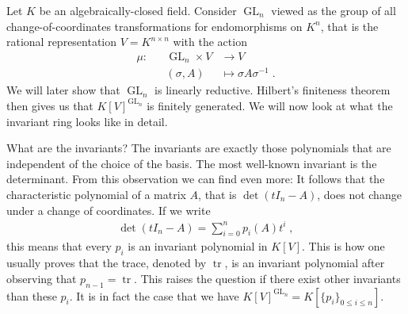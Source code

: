 \begin{dexample}
  Let $K$ be an algebraically-closed field.
  Consider $\operatorname{GL}_n$ viewed as the group of all change-of-coordinates transformations for endomorphisms on $K^n$, that is the rational representation $V = K^{n\times n}$ with the action
  \begin{equation*}
    \begin{aligned}
      \mu \colon && \operatorname{GL}_n \times V  & \longrightarrow V \\
      && (\sigma,A) &\longmapsto \sigma A \sigma^{-1} \; .
    \end{aligned}
  \end{equation*}
  We will later show that $\operatorname{GL}_n$ is linearly reductive.
  Hilbert's finiteness theorem then gives us that $K[V]^{\operatorname{GL}_n}$ is finitely generated.
  We will now look at what the invariant ring looks like in detail.
  
  What are the invariants?
  The invariants are exactly those polynomials that are independent of the choice of the basis.
  The most well-known invariant is the determinant.
  From this observation we can find even more:
  It follows that the characteristic polynomial of a matrix $A$, that is $\operatorname{det} (tI_n - A)$, does not change under a change of coordinates.
  If we write
  \begin{equation*}
    \begin{aligned}
      \operatorname{det} (tI_n - A) = \sum_{i=0}^n p_i (A) t^i \; ,
    \end{aligned}
  \end{equation*}
  this means that every $p_i$ is an invariant polynomial in $K[V]$.
  This is how one usually proves that the trace, denoted by $\operatorname{tr}$, is an invariant polynomial after observing that $p_{n-1} = \operatorname{tr}$.
  This raises the question if there exist other invariants than these $p_i$.
  It is in fact the case that we have $K[V]^{\operatorname{GL}_n} = K[\{p_i\}_{0\leq i\leq n}]$.
\end{dexample}
